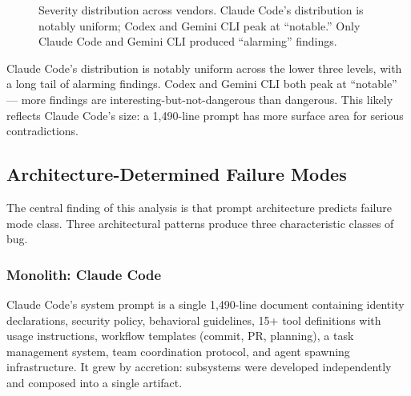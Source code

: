 \begin{figure}[t]
\centering
{}
\caption{Severity distribution across vendors. Claude Code's distribution
  is notably uniform; Codex and Gemini CLI peak at ``notable.''
  Only Claude Code and Gemini CLI produced ``alarming'' findings.}
\label{fig:severity}
\end{figure}

Claude Code's distribution is notably uniform across the lower three
levels, with a long tail of alarming findings. Codex and Gemini CLI both
peak at ``notable'' --- more findings are interesting-but-not-dangerous
than dangerous. This likely reflects Claude Code's size: a 1,490-line
prompt has more surface area for serious contradictions.

\subsection{Architecture-Determined Failure Modes}

The central finding of this analysis is that prompt architecture
predicts failure mode class. Three architectural patterns produce three
characteristic classes of bug.

\subsubsection{Monolith: Claude Code}

Claude Code's system prompt is a single 1,490-line document containing
identity declarations, security policy, behavioral guidelines, 15+ tool
definitions with usage instructions, workflow templates (commit, PR,
planning), a task management system, team coordination protocol, and
agent spawning infrastructure. It grew by accretion: subsystems were
developed independently and composed into a single artifact.

